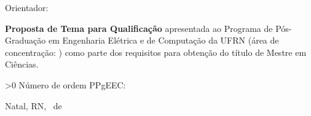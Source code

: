 \begin{titlepage}
\begin{center}
\vfill

\LARGE

\textbf{\titulo}

\vfill

\Large

\textbf{\nome}

\vfill

\normalsize

Orientador: \orientadorTitulo\ \orientadorNome 
{}


\vfill

\hfill
\ifnum{}
  \newcommand{\tmpTitulo}{Mestre em Ciências}
\else
  \newcommand{\tmpTitulo}{Doutor em Ciências}
\fi

\ifnum{}
  \newcommand{\tmpTipoTrabalho}{Proposta de Tema para Qualificação}
\else
  \ifnum{}
    \newcommand{\tmpTipoTrabalho}{Dissertação de Mestrado}
  \else
    \newcommand{\tmpTipoTrabalho}{Tese de Doutorado}
  \fi
\fi

\parbox{0.5\linewidth}{\textbf{\tmpTipoTrabalho} apresentada ao Programa de Pós-Graduação em Engenharia Elétrica e de Computação da UFRN
(área de concentração: \areaConcentracao)
como parte dos requisitos para obtenção do título de \tmpTitulo .
}

\vfill

\large

\ifnum\etapaTrabalho>0
Número de ordem PPgEEC: \numeroOrdem
\fi

Natal, RN, \ de 

\end{center}

\end{titlepage}
